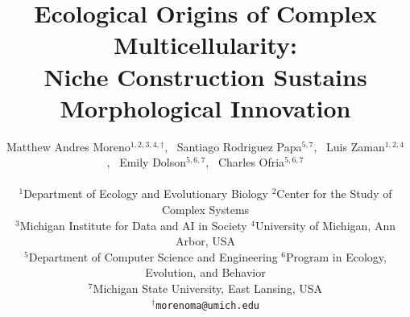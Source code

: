 
\title{
    Ecological Origins of Complex Multicellularity:\\Niche Construction Sustains Morphological Innovation
}

\author{
    Matthew Andres Moreno$^{1,2,3,4,\dagger}$,\ %
    Santiago Rodriguez Papa$^{5,7}$,\ %
    Luis Zaman$^{1,2,4}$,\ %
    Emily Dolson$^{5,6,7}$,\ %
    Charles Ofria$^{5,6,7}$ \\
    \mbox{}\\
    $^1$Department of Ecology and Evolutionary Biology
    $^2$Center for the Study of Complex Systems \\
    $^3$Michigan Institute for Data and AI in Society
    $^4$University of Michigan, Ann Arbor, USA \\
    $^5$Department of Computer Science and Engineering
    $^6$Program in Ecology, Evolution, and Behavior \\
    $^7$Michigan State University, East Lansing, USA \\
    $^\dagger$\texttt{morenoma@umich.edu}
}

\maketitle

%
%

